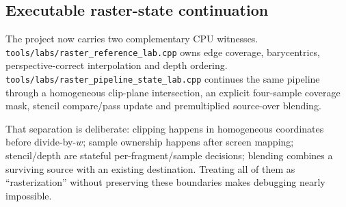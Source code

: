 \subsection{Executable raster-state continuation}\label{appendix-40426e4b2103-executable-raster-state-continuation}

The project now carries two complementary CPU witnesses. \texttt{tools/labs/raster\_reference\_lab.cpp} owns edge coverage, barycentrics, perspective-correct interpolation and depth ordering. \texttt{tools/labs/raster\_pipeline\_state\_lab.cpp} continues the same pipeline through a homogeneous clip-plane intersection, an explicit four-sample coverage mask, stencil compare/pass update and premultiplied source-over blending.

That separation is deliberate: clipping happens in homogeneous coordinates before divide-by-\(w\); sample ownership happens after screen mapping; stencil/depth are stateful per-fragment/sample decisions; blending combines a surviving source with an existing destination. Treating all of them as ``rasterization'' without preserving these boundaries makes debugging nearly impossible.
